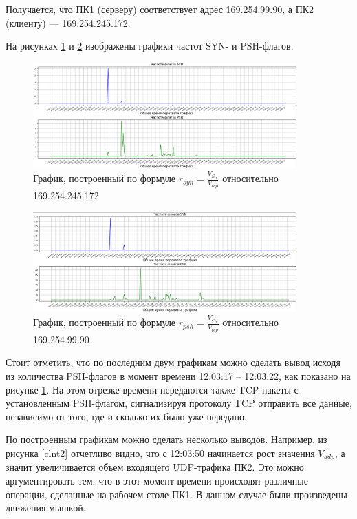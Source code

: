 \documentclass[bachelor, och, coursework]{SCWorks}
\begin{document}
  Получается, что ПК1 (серверу) соответствует адрес 169.254.99.90, а ПК2 (клиенту) --- 169.254.245.172.

  На рисунках \ref{clnt4} и \ref{serv4} изображены графики частот SYN- и PSH-флагов.

  \begin{figure}[H]
    \centering
    \includegraphics[width=0.9\textwidth]{photo/clnt4.png}
    \caption{График, построенный по формуле $r_{syn} = \frac{V_{S_{in}}}{V_{tcp}}$ относительно 169.254.245.172}
    \label{clnt4}
  \end{figure}

  \begin{figure}[H]
    \centering
    \includegraphics[width=0.9\textwidth]{photo/serv4.png}
    \caption{График, построенный по формуле $r_{psh} = \frac{V_{P_{in}}}{V_{tcp}}$ относительно 169.254.99.90}
    \label{serv4}
  \end{figure}

  Стоит отметить, что по последним двум графикам можно сделать вывод исходя из количества PSH-флагов в момент времени 12:03:17 --
  12:03:22, как показано на рисунке \ref{clnt4}. На этом отрезке времени передаются также TCP-пакеты с установленным PSH-флагом,
  сигнализируя протоколу TCP отправить все данные, независимо от того, где и сколько их было уже передано.

  По построенным графикам можно сделать несколько выводов.
  Например, из рисунка \ref{clnt2} отчетливо видно, что с 12:03:50 начинается рост значения $V_{udp}$, а значит
  увеличивается объем входящего UDP-трафика ПК2. Это можно аргументировать тем, что в этот момент времени происходят
  различные операции, сделанные на рабочем столе ПК1. В данном случае были произведены движения мышкой.
\end{document}
